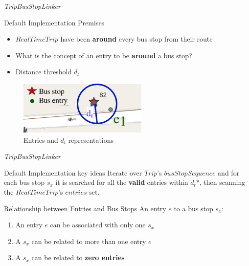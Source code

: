 \documentclass[xcolor=dvipsnames,table]{beamer}
\begin{document}
\begin{frame}{\textit{TripBusStopLinker}}
        \begin{block}{Default Implementation Premises}
                \begin{itemize}
                        \item $RealTimeTrip$ have
                                been \textbf{around} every bus stop from their route
                        \item What is the concept of an entry to be \textbf{around} a bus stop?
                        \item Distance threshold $d_t$
                \end{itemize}
        \end{block}
        \begin{figure}[H]
                \centering
                \includegraphics[scale=.6]{images/entriesDT.drawio.png}
                \caption{Entries and $d_t$ representations}
        \end{figure}
\end{frame}
\begin{frame}{\textit{TripBusStopLinker}}
        \begin{block}{Default Implementation key ideas}
                Iterate over $Trip$'s $busStopSequence$
                and for each bus stop $s_x$ it is searched for all the \textbf{valid} entries within $d_t$*, then scanning the $RealTimeTrip$'s $entries$ set.
        \end{block}
        \begin{block}{Relationship between Entries and Bus Stops}
                An entry $e$ to a bus stop $s_x$:
                \begin{enumerate}
                        \item An entry $e$ can be associated with only one $s_x$
                        \item A $s_x$ can be related to more than one entry $e$
                        \item A $s_x$ can be related to \textbf{zero entries}
                \end{enumerate}
        \end{block}
\end{frame}
\end{document}
